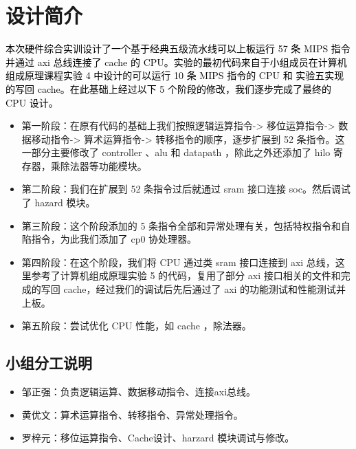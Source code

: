 
\section{设计简介}
\textcolor{black}{本次硬件综合实训设计了一个基于经典五级流水线可以上板运行 57 条 MIPS 指令并通过 axi 总线连接了 cache 的 CPU。实验的最初代码来自于小组成员在计算机组成原理课程实验 4 中设计的可以运行 10 条 MIPS 指令的 CPU 和 实验五实现的写回 cache。在此基础上经过以下 5 个阶段的修改，我们逐步完成了最终的 CPU 设计。}
\begin{itemize}
    \item 第一阶段：在原有代码的基础上我们按照逻辑运算指令-> 移位运算指令-> 数据移动指令-> 算术运算指令-> 转移指令的顺序，逐步扩展到 52 条指令。这一部分主要修改了 controller 、alu 和 datapath ，除此之外还添加了 hilo 寄存器，乘除法器等功能模块。
    \item 第二阶段：我们在扩展到 52 条指令过后就通过 sram 接口连接 soc。然后调试了 hazard 模块。
    \item 第三阶段：这个阶段添加的 5 条指令全部和异常处理有关，包括特权指令和自陷指令，为此我们添加了 cp0 协处理器。
    \item 第四阶段：在这个阶段，我们将 CPU 通过类 sram 接口连接到 axi 总线，这里参考了计算机组成原理实验 5 的代码，复用了部分 axi 接口相关的文件和完成的写回 cache，经过我们的调试后先后通过了 axi 的功能测试和性能测试并上板。
    \item 第五阶段：尝试优化 CPU 性能，如 cache ，除法器。
    
\end{itemize}

\subsection{小组分工说明}


\begin{itemize}
    \item 邹正强：负责逻辑运算、数据移动指令、连接axi总线。
    \item 黄优文：算术运算指令、转移指令、异常处理指令。
    \item 罗梓元：移位运算指令、Cache设计、harzard 模块调试与修改。
\end{itemize}